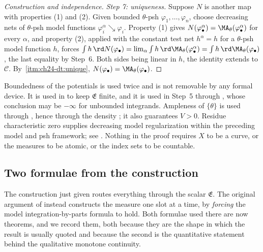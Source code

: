 \begin{proof}[Construction and independence]
\emph{Step 7: uniqueness.}  Suppose $N$ is another map with properties (1)
and (2).  Given bounded $\theta$-psh $\varphi_1,\ldots,\varphi_n$,
choose decreasing nets of $\theta$-psh model functions
$\varphi_i^\alpha\searrow\varphi_i$.  Property (1) gives
$N(\varphi^\alpha_\bullet)=\MA_\theta(\varphi^\alpha_\bullet)$ for every
$\alpha$, and property (2), applied with the constant test net
$h^\alpha=h$ for a $\theta$-psh model function $h$, forces
$\int h\,\rd N(\varphi_\bullet)=\lim_\alpha\int h\,
\rd\MA_\theta(\varphi^\alpha_\bullet)
=\int h\,\rd\MA_\theta(\varphi_\bullet)$, the last equality by Step~6.
Both sides being linear in $h$, the identity extends to $\mathcal C$.  By
\,\cref{itm:ch24-dt:unique},
$N(\varphi_\bullet)=\MA_\theta(\varphi_\bullet)$.
\end{proof}

\begin{remark}
\label{rem:ch24-extension-audit}
Boundedness of the potentials is used twice and is not removable by any
formal device.  It is used in  to keep
$\mathfrak E$ finite, and it is used in Step~5 through
, whose conclusion may be $-\infty$ for
unbounded integrands.  Ampleness of $\{\theta\}$ is used through
, hence through the density
; it also guarantees $V>0$.  Residue
characteristic zero supplies decreasing model regularization within the
preceding model and psh framework; see .
Nothing in the proof requires $X$ to be a curve, or the measures to be
atomic, or the index sets to be countable.
\end{remark}

\subsection{Two formulae from the construction}
\label{sec:ch24-two-formulae}

The construction just given routes everything through the scalar
$\mathfrak E$.  The original argument of \cite[\S3]{BFJ15} instead
constructs the measure one slot at a time, by \emph{forcing} the model
integration-by-parts formula to hold.  Both formulae used there are now
theorems, and we record them, both because they are the shape in which the
result is usually quoted and because the second is the quantitative
statement behind the qualitative monotone continuity.

